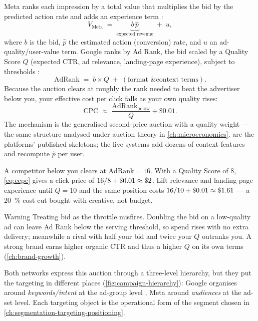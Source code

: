 Meta ranks each impression by a total value that multiplies the bid by the predicted action rate and adds an experience term \parencite{metadev-advantage-campaigns}:
\begin{equation}\label{eq:metavalue}
  V_{\text{Meta}} \;=\; \underbrace{b\,\hat p}_{\text{expected revenue}} \;+\; u,
\end{equation}
where $b$ is the bid, $\hat p$ the estimated action (conversion) rate, and $u$ an ad-quality/user-value term. Google ranks by Ad Rank, the bid scaled by a Quality Score $Q$ (expected CTR, ad relevance, landing-page experience), subject to thresholds \parencite{gads1722122,gads7634668}:
\begin{equation}\label{eq:adrank}
  \mathrm{AdRank} \;=\; b \times Q \;+\;(\text{format \& context terms}).
\end{equation}
Because the auction clears at roughly the rank needed to beat the advertiser below you, your effective cost per click falls as your own quality rises:
\begin{equation}\label{eq:ecpc}
  \mathrm{CPC} \;\approx\; \frac{\mathrm{AdRank}_{\text{below}}}{Q} + \$0.01 .
\end{equation}
The mechanism is the generalised second-price auction with a quality weight --- the same structure analysed under auction theory in \cref{ch:microeconomics}.  are the platforms' published skeletons; the live systems add dozens of context features and recompute $\hat p$ per user.

\begin{example}
A competitor below you clears at $\mathrm{AdRank}=16$. With a Quality Score of $8$, \cref{eq:ecpc} gives a click price of $16/8+\$0.01\approx\$\num{2}$. Lift relevance and landing-page experience until $Q=10$ and the same position costs $16/10+\$0.01\approx\$\num{1}.61$ --- a \qty{20}{\percent} cost cut bought with creative, not budget.
\end{example}

\begin{admonition}{Warning}
Treating bid as the throttle misfires. Doubling the bid on a low-quality ad can leave Ad Rank below the serving threshold, so spend rises with no extra delivery; meanwhile a rival with half your bid and twice your $Q$ outranks you. A strong brand earns higher organic CTR and thus a higher $Q$ on its own terms (\cref{ch:brand-growth}).
\end{admonition}

Both networks express this auction through a three-level hierarchy, but they put the targeting in different places (\cref{fig:campaign-hierarchy}): Google organises around \emph{keywords/intent} at the ad-group level \parencite{gads14752782,gads2375404}, Meta around \emph{audiences} at the ad-set level. Each targeting object is the operational form of the segment chosen in \cref{ch:segmentation-targeting-positioning}.

